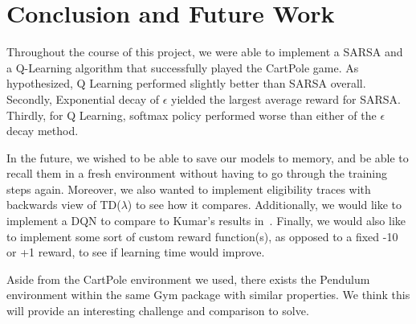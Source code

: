 \section{Conclusion and Future Work}

Throughout the course of this project, we were able to implement a SARSA and a Q-Learning algorithm that successfully played the CartPole game. 
As hypothesized, Q Learning performed slightly better than SARSA overall. Secondly, Exponential decay of $\epsilon$ yielded the largest average reward for SARSA. Thirdly, for Q Learning, softmax policy performed worse than either of the $\epsilon$ decay method. 

In the future, we wished to be able to save our models to memory, and be able to recall them in a fresh environment without having to go through the training
steps again. Moreover, we also wanted to implement eligibility traces with backwards view of TD($\lambda$) to see how it compares. Additionally, we would like to implement a DQN to compare to Kumar's results in~\citep{kumar2020balancing}. Finally, we would also like to implement
some sort of custom reward function(s), as opposed to a fixed -10 or +1 reward, to see if learning time would improve.

Aside from the CartPole environment we used, there exists the Pendulum environment within the same Gym package with similar properties. We think this
will provide an interesting challenge and comparison to solve.